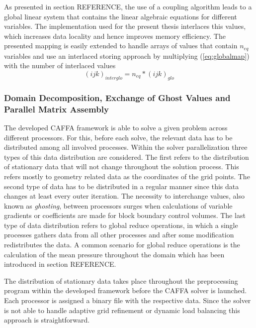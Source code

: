 As presented in section REFERENCE, the use of a coupling algorithm leads to a global linear system that contains the linear algebraic equations for different variables. The implementation used for the present thesis interlaces this values, which increases data locality and hence improves memory efficiency. The presented mapping is easily extended to handle arrays of values that contain \(n_{eq}\) variables and use an interlaced storing approach by multiplying (\ref{eq:globalmap}) with the number of interlaced values
\begin{displaymath}
  (ijk)_{interglo} = n_{eq} * (ijk)_{glo} 
\end{displaymath}

\subsubsection{Domain Decomposition, Exchange of Ghost Values and Parallel Matrix Assembly}

The developed CAFFA framework is able to solve a given problem across different processors. For this, before each solve, the relevant data has to be distributed among all involved processes. Within the solver parallelization three types of this data distribution are considered. The first refers to the distribution of stationary data that will not change throughout the solution process. This refers mostly to geometry related data as the coordinates of the grid points. The second type of data has to be distributed in a regular manner since this data changes at least every outer iteration. The necessity to interchange values, also known as \emph{ghosting}, between processors surges when calculations of variable gradients or coefficients are made for block boundary control volumes. The last type of data distribution refers to global reduce operations, in which a single processes gathers data from all other processes and after some modification redistributes the data. A common scenario for global reduce operations is the calculation of the mean pressure throughout the domain which has been introduced in section REFERENCE.

The distribution of stationary data takes place throughout the preprocessing program within the developed framework before the CAFFA solver is launched. Each processor is assigned a binary file with the respective data. Since the solver is not able to handle adaptive grid refinement or dynamic load balancing this approach is straightforward.

